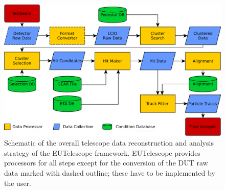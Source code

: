 \begin{figure}[tbp]
\center
\includegraphics[width=.9\textwidth]{figures/eutel-strategy.png}
\caption[The EUTelescope data analysis strategy]{Schematic of the overall telescope data reconstruction and analysis strategy of the EUTelescope framework.
EUTelescope provides processors for all steps except for the conversion of the DUT raw data marked with dashed outline; these have to be implemented by the user.}
\label{fig:offline:strategy}
\end{figure}


